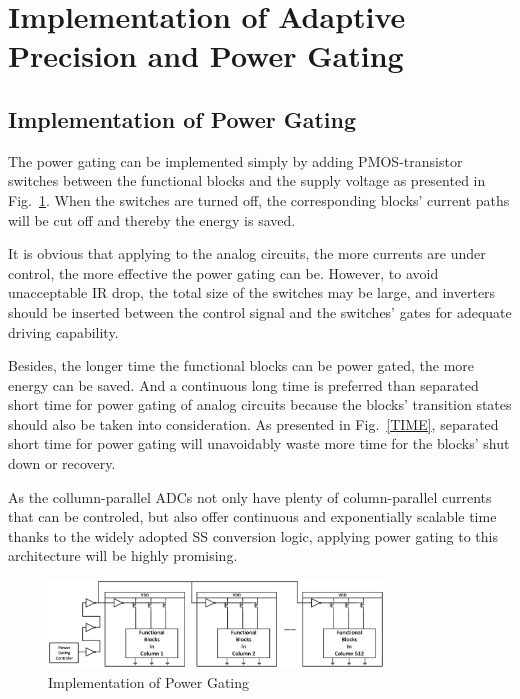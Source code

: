 \section{Implementation of Adaptive Precision and Power Gating}\label{strategy}

\subsection{Implementation of Power Gating}

The power gating can be implemented simply by adding PMOS-transistor switches between the functional blocks and the supply voltage \cite{keating_low_2007} as presented in Fig.~\ref{GATING}. 
When the switches are turned off, the corresponding blocks’ current paths will be cut off and thereby the energy is saved. 

It is obvious that applying to the analog circuits, the more currents are under control, the more effective the power gating can be. However, to avoid unacceptable IR drop, the total size of the switches may be large, 
and inverters should be inserted between the control signal and the switches’ gates for adequate driving capability. 

Besides, the longer time the functional blocks can be power gated, the more energy can be saved. And a continuous long time is preferred than separated short time for power gating of analog circuits because the blocks' transition states should also be taken into consideration.
As presented in Fig.~\ref{TIME}, separated short time for power gating will unavoidably waste more
time for the blocks' shut down or recovery. 

As the collumn-parallel ADCs not only have plenty of column-parallel currents that can be controled, but also offer continuous and exponentially scalable time thanks to the widely adopted SS conversion logic, applying power gating to this architecture will be highly promising.

\begin{figure}[htbp]
	\centerline{\includegraphics[width=3.5in]{./Figures/GATING.eps}}
	\caption{Implementation of Power Gating}
	\label{GATING}
\end{figure} 

